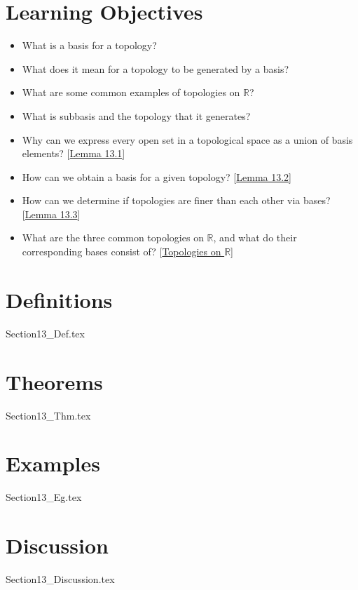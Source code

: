 \section{Learning Objectives}

\begin{itemize}
    \item What is a basis for a topology?
    \item What does it mean for a topology to be generated by a basis?
    \item What are some common examples of topologies on \( \mathbb{R} \)?
    \item What is subbasis and the topology that it generates?
    \item Why can we express every open set in a topological space as a union
        of basis elements? [\hyperlink{lem:13.1}{Lemma 13.1}]
    \item How can we obtain a basis for a given topology?
        [\hyperlink{lem:13.2}{Lemma 13.2}]
    \item How can we determine if topologies are finer than each other via 
        bases? [\hyperlink{lem:13.3}{Lemma 13.3}]
    \item What are the three common topologies on \( \mathbb{R} \), and what 
        do their corresponding bases consist of? 
        [\hyperlink{def:13_R_top}{Topologies on \( \mathbb{R} \)}]
\end{itemize}

\section{Definitions}

{Section13_Def.tex}

\section{Theorems}

{Section13_Thm.tex}

\section{Examples}

{Section13_Eg.tex}

\section{Discussion}

{Section13_Discussion.tex}